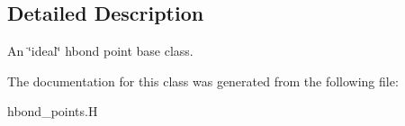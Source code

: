 \subsection{Detailed Description}
An \char`\"{}ideal\char`\"{} hbond point base class. 



The documentation for this class was generated from the following file:\begin{CompactItemize}
\item 
hbond\_\-points.H\end{CompactItemize}
